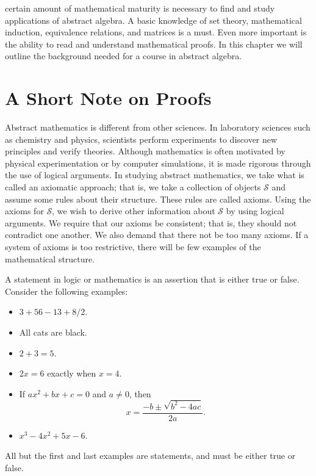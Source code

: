 
 
certain amount of mathematical maturity is necessary to find and study applications of abstract algebra.  A basic knowledge of set theory, mathematical induction, equivalence relations, and matrices is a must.  Even more important is the ability to read and understand mathematical proofs.  In this chapter we will outline the background needed for a course in abstract algebra.
 

\section{A Short Note on Proofs}
 
Abstract mathematics is different from other sciences. In laboratory sciences such as chemistry and physics, scientists perform experiments to discover new principles and verify theories.  Although mathematics is often motivated by physical experimentation or by computer simulations, it is made rigorous through the use of logical arguments.  In studying abstract mathematics, we take what is called an  axiomatic approach; that is, we take a collection of objects $\mathcal S$ and assume some rules about their structure.  These rules are called {\bfi axioms}.  Using the axioms for $\mathcal S$, we wish to derive other information about $\mathcal S$ by using logical arguments.  We require that our axioms be consistent; that is, they should not contradict one another.  We also demand that there not be too many axioms.  If a system of axioms is too restrictive,  there will be few examples of the mathematical structure.  

A {\bfi statement\/} in logic or mathematics is an assertion that is either true or false.  Consider the following examples:
\begin{itemize}
 
\item
$3 + 56 - 13 + 8/2 $.
 
\item
All cats are black.
 
\item
$2 + 3 = 5$.
 
\item
$2x = 6$ exactly when $x = 4$.
 
\item
If $ax^2 + bx + c = 0$ and $a \neq 0$, then
\[
x = \frac{-b \pm \sqrt{b^2 - 4ac}}{2a}.
\]
 
\item
$x^3 - 4x^2 + 5 x - 6$.
 
\end{itemize}
All but the first  and last examples are statements, and must be either true or false.  
 
